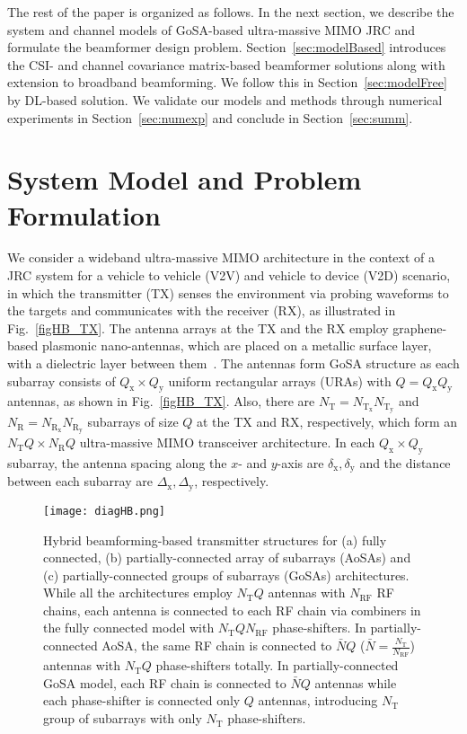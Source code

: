 \documentclass[journal,10pt]{IEEEtran}
\begin{document}
	
	The rest of the paper is organized as follows. In the next section, we describe the system and channel models of GoSA-based ultra-massive MIMO JRC and formulate the beamformer design problem. Section~\ref{sec:modelBased} introduces the CSI- and channel covariance matrix-based beamformer solutions along with extension to broadband beamforming. We follow this in Section~\ref{sec:modelFree} by DL-based solution. We validate our models and methods through numerical experiments in Section~\ref{sec:numexp} and conclude in Section~\ref{sec:summ}.
	
	\section{System Model and Problem Formulation}
	\label{sec:sysmod}
	{\color{black}We consider a wideband ultra-massive MIMO architecture} in the context of a JRC system for a vehicle to vehicle (V2V) and vehicle to device (V2D) scenario, in which the transmitter (TX) senses the environment via probing waveforms to the targets and communicates with the receiver (RX), as illustrated in Fig.~\ref{figHB_TX}. The antenna arrays at the TX and the RX employ graphene-based plasmonic nano-antennas, which are placed on a metallic surface layer, with a dielectric layer between them~\cite{ummimoGrapheneArray,ummimoTareq,ummimoComMagYeLi}. The antennas form GoSA structure as each subarray consists of $Q_\mathrm{x}\times Q_\mathrm{y}$ uniform rectangular arrays (URAs) with $Q=Q_\mathrm{x}Q_\mathrm{y}$ antennas, as shown in Fig.~\ref{figHB_TX}. Also, there are $N_\mathrm{T} = N_\mathrm{T_x} N_\mathrm{T_y}$ and $N_\mathrm{R}=N_\mathrm{R_x}N_\mathrm{R_y}$ subarrays of size $Q$ at the TX and RX, respectively, which form an $N_\mathrm{T}Q\times N_\mathrm{R}Q$ ultra-massive MIMO transceiver architecture. In each $Q_\mathrm{x}\times Q_\mathrm{y}$ subarray, the antenna spacing along the $x$- and $y$-axis are $ \delta_\mathrm{x}, \delta_\mathrm{y}$ and the distance between each subarray are $\Delta_\mathrm{x},\Delta_\mathrm{y}$, respectively.
	
	
	
	\begin{figure*}[t]
		\centering
		{\texttt{[image: diagHB.png]} }
		\caption{Hybrid beamforming-based transmitter structures for (a) fully connected, (b) partially-connected array of subarrays (AoSAs) and (c) partially-connected groups of subarrays (GoSAs) architectures. While all the architectures employ $N_\mathrm{T}Q$ antennas with $N_\mathrm{RF}$ RF chains, each antenna is connected to each RF chain via combiners in the fully connected model with $N_\mathrm{T}QN_\mathrm{RF}$ phase-shifters. In partially-connected AoSA, the same RF chain is connected to $\bar{N}Q$ ($\bar{N} = \frac{N_\mathrm{T}}{N_\mathrm{RF}}$) antennas with $N_\mathrm{T}Q$ phase-shifters totally. In partially-connected GoSA model, each RF chain is connected to $\bar{N}Q$ antennas while each phase-shifter is connected only $Q$ antennas, introducing $N_\mathrm{T}$ group of subarrays with only  $N_\mathrm{T}$ phase-shifters.}
		\label{figHB}
	\end{figure*}
	
\end{document}
